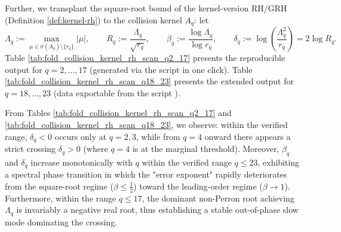 
Further, we transplant the square-root bound of the kernel-version RH/GRH (Definition \ref{def:kernel-rh}) to the collision kernel \(A_q\): let
\[
\Lambda_q:=\max_{\mu\in\sigma(A_q)\setminus\{r_q\}}|\mu|,
\qquad
R_q:=\frac{\Lambda_q}{\sqrt{r_q}},
\qquad
\beta_q:=\frac{\log \Lambda_q}{\log r_q},
\qquad
\delta_q:=\log\!\left(\frac{\Lambda_q^2}{r_q}\right)=2\log R_q.
\]
Table \ref{tab:fold_collision_kernel_rh_scan_q2_17} presents the reproducible output for \(q=2,\dots,17\) (generated via the script  in one click).
Table \ref{tab:fold_collision_kernel_rh_scan_q18_23} presents the extended output for \(q=18,\dots,23\) (data exportable from the script ).



\begin{remark}[Systematic crossing and rapid deterioration starting from \texorpdfstring{$q=4$}{q=4}]\label{rem:pom-collision-kernel-rh-phase}
From Tables \ref{tab:fold_collision_kernel_rh_scan_q2_17} and \ref{tab:fold_collision_kernel_rh_scan_q18_23}, we observe: within the verified range, \(\delta_q<0\) occurs only at \(q=2,3\), while from \(q=4\) onward there appears a strict crossing \(\delta_q>0\) (where \(q=4\) is at the marginal threshold).
Moreover, \(\beta_q\) and \(\delta_q\) increase monotonically with \(q\) within the verified range \(q\le 23\), exhibiting a spectral phase transition in which the "error exponent" rapidly deteriorates from the square-root regime (\(\beta\le\frac12\)) toward the leading-order regime (\(\beta\to 1\)).
Furthermore, within the range \(q\le 17\), the dominant non-Perron root achieving \(\Lambda_q\) is invariably a negative real root, thus establishing a stable out-of-phase slow mode dominating the crossing.
\end{remark}


